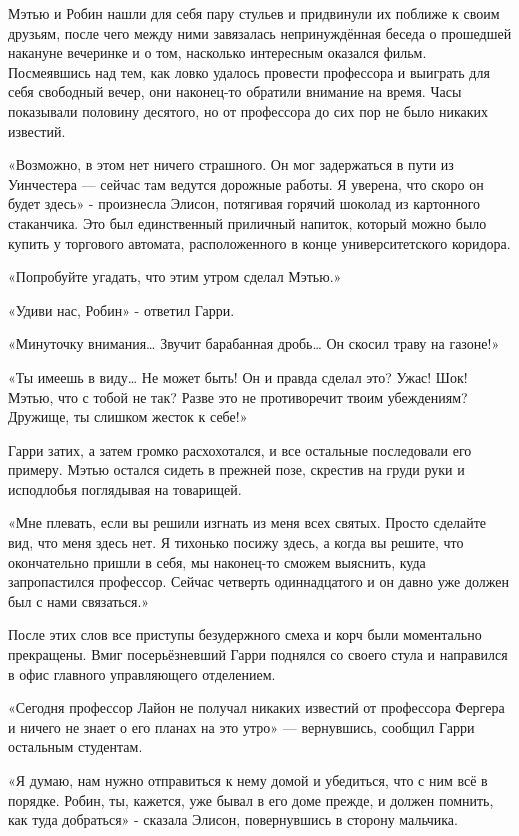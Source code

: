 \documentclass[a5paper, 9pt,
final, openany, twoside=true]{memoir}
\begin{document}
Мэтью и Робин нашли для себя пару стульев и придвинули их поближе к своим друзьям, после чего между ними завязалась непринуждённая беседа о прошедшей накануне вечеринке и о том, насколько интересным оказался фильм. Посмеявшись над тем, как ловко удалось провести профессора и выиграть для себя свободный вечер, они наконец-то обратили внимание на время. Часы показывали половину десятого, но от профессора до сих пор не было никаких известий.

«Возможно, в этом нет ничего страшного. Он мог задержаться в пути из Уинчестера — сейчас там ведутся дорожные работы. Я уверена, что скоро он будет здесь» - произнесла Элисон, потягивая горячий шоколад из картонного стаканчика. Это был единственный приличный напиток, который можно было купить у торгового автомата, расположенного в конце университетского коридора.

«Попробуйте угадать, что этим утром сделал Мэтью.»

«Удиви нас, Робин» - ответил Гарри.

«Минуточку внимания…  Звучит барабанная дробь… Он скосил траву на газоне!»

«Ты имеешь в виду… Не может быть! Он и правда сделал это? Ужас! Шок! Мэтью, что с тобой не так? Разве это не противоречит твоим убеждениям? Дружище, ты слишком жесток к себе!»

Гарри затих, а затем громко расхохотался, и все остальные последовали его примеру. Мэтью остался сидеть в прежней позе, скрестив на груди руки и исподлобья поглядывая на товарищей.

«Мне плевать, если вы решили изгнать из меня всех святых. Просто сделайте вид, что меня здесь нет. Я тихонько посижу здесь, а когда вы решите, что окончательно пришли в себя, мы наконец-то сможем выяснить, куда запропастился профессор. Сейчас четверть одиннадцатого и он давно уже должен был с нами связаться.»

После этих слов все приступы безудержного смеха и корч были моментально прекращены. Вмиг посерьёзневший Гарри поднялся со своего стула и направился в офис главного управляющего отделением.\bigskip

«Сегодня профессор Лайон не получал никаких известий от профессора Фергера и ничего не знает о его планах на это утро» — вернувшись, сообщил Гарри остальным студентам.

«Я думаю, нам нужно отправиться к нему домой и убедиться, что с ним всё в порядке. Робин, ты, кажется, уже бывал в его доме прежде, и должен помнить, как туда добраться» - сказала Элисон, повернувшись в сторону мальчика.
\end{document}
